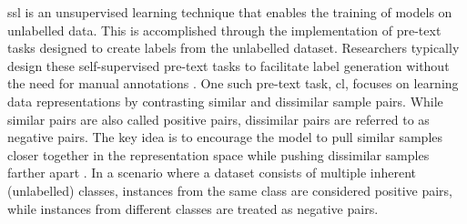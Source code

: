 \acf{ssl} is an unsupervised learning technique that enables the training of models on unlabelled data.
This is accomplished through the implementation of pre-text tasks 
designed to create labels from the unlabelled dataset.
Researchers typically design these self-supervised pre-text tasks 
to facilitate label generation without the need for manual annotations \citep{PIC_2020}.
One such pre-text task, \acf{cl}, 
focuses on learning data representations by contrasting similar and dissimilar sample pairs. 
While similar pairs are also called positive pairs, 
dissimilar pairs are referred to as negative pairs.
The key idea is to encourage the model to pull similar samples closer together in the representation space 
while pushing dissimilar samples farther apart \citep{mining_potential_2024}.
In a scenario where a dataset consists of multiple inherent (unlabelled) classes, 
instances from the same class are considered positive pairs, 
while instances from different classes are treated as negative pairs.